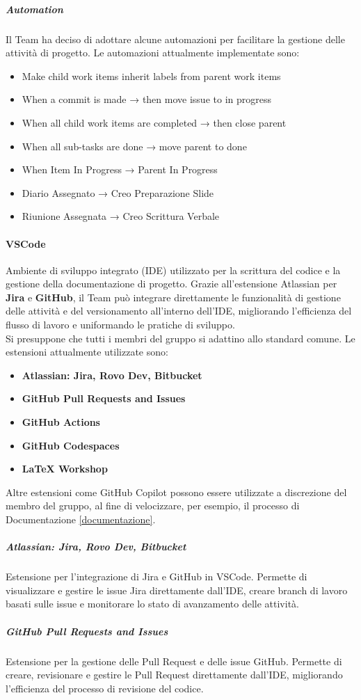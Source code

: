 \documentclass[a4paper,12pt]{article}
\begin{document}
\subparagraph{Automation}\label{JiraAutomation}
Il Team ha deciso di adottare alcune automazioni per facilitare la gestione
delle attività di progetto. Le automazioni attualmente implementate sono:
\begin{itemize}
    \item Make child work items inherit labels from parent work items
    \item When a commit is made → then move issue to in progress
    \item When all child work items are completed → then close parent
    \item When all sub-tasks are done → move parent to done
    \item When Item In Progress → Parent In Progress
    \item Diario Assegnato → Creo Preparazione Slide
    \item Riunione Assegnata → Creo Scrittura Verbale
\end{itemize}

\paragraph{VSCode} \label{vscode}
Ambiente di sviluppo integrato (IDE) utilizzato per la scrittura del codice e
la gestione della documentazione di progetto. Grazie all'estensione Atlassian
per \textbf{Jira} e \textbf{GitHub}, il Team può integrare direttamente le
funzionalità di gestione delle attività e del versionamento all'interno
dell'IDE, migliorando l'efficienza del flusso di lavoro e uniformando le
pratiche di sviluppo. \\ Si presuppone che tutti i membri del gruppo si
adattino allo standard comune. Le estensioni attualmente utilizzate sono:
\begin{itemize}
    \item \textbf{Atlassian: Jira, Rovo Dev, Bitbucket}
    \item \textbf{GitHub Pull Requests and Issues}
    \item \textbf{GitHub Actions}
    \item \textbf{GitHub Codespaces}
    \item \textbf{LaTeX Workshop}
\end{itemize}
Altre estensioni come GitHub Copilot possono essere utilizzate a discrezione del
membro del gruppo, al fine di velocizzare, per esempio, il processo di Documentazione \ref{documentazione}.

\subparagraph{Atlassian: Jira, Rovo Dev, Bitbucket}
Estensione per l'integrazione di Jira e GitHub in VSCode. Permette di visualizzare e gestire le issue Jira direttamente dall'IDE, creare branch di
lavoro basati sulle issue e monitorare lo stato di avanzamento delle attività.\\
\subparagraph{GitHub Pull Requests and Issues}
Estensione per la gestione delle Pull Request e delle issue GitHub. Permette di
creare, revisionare e gestire le Pull Request direttamente dall'IDE, migliorando
l'efficienza del processo di revisione del codice.\\
\end{document}
